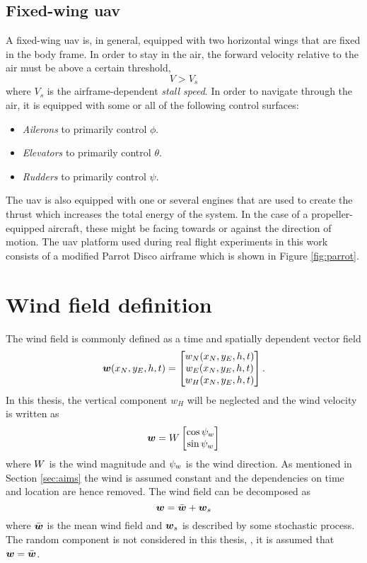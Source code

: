 \subsection{Fixed-wing \ac{uav}}
A fixed-wing \ac{uav} is, in general, equipped with two horizontal wings that are fixed in the body frame.
In order to stay in the air, the forward velocity relative to the air must be above a certain threshold, \ie
\begin{equation}
    V > V_{s}
\end{equation}
where $V_s$ is the airframe-dependent \textit{stall speed}. In order to navigate through the
air, it is equipped with some or all of the following control surfaces:
\begin{itemize}
    \item \textit{Ailerons} to primarily control $\phi$.
    \item \textit{Elevators} to primarily control $\theta$.
    \item \textit{Rudders} to primarily control $\psi$.
\end{itemize}
The \ac{uav} is also equipped with one or several engines that are used to create the thrust which
increases the total energy of the system. In the case of a propeller-equipped aircraft, these might be facing towards or against the direction of motion.
The \ac{uav} platform used during real flight experiments in this work consists of a modified Parrot Disco airframe which is shown in Figure \ref{fig:parrot}.


\section{Wind field definition}
The wind field is commonly defined as a time and spatially dependent vector field \cite{wind_direct_computation}
\begin{equation}
    \boldsymbol{w}(x_N,y_E,h,t)=
    \begin{bmatrix}
        w_N(x_N,y_E,h,t) \\
        w_E(x_N,y_E,h,t) \\
        w_H(x_N,y_E,h,t)
    \end{bmatrix}
    .
\end{equation}
In this thesis, the vertical component $w_H$ will be neglected and the wind velocity is written as 
\begin{equation}
    \boldsymbol{w}=W\begin{bmatrix}
        \cos\psi_w\\
        \sin\psi_w
    \end{bmatrix}
\end{equation}
where $W$ is the wind magnitude and $\psi_w$ is the wind direction. 
As mentioned in Section \ref{sec:aims} the wind is assumed constant and the dependencies on time and location are hence removed.
The wind field can be decomposed as
\begin{equation}
    \boldsymbol{w} = \bar{\boldsymbol{w}} + \boldsymbol{w}_s
\end{equation}
where $\bar{\boldsymbol{w}}$ is the mean wind field and $\boldsymbol{w}_s$ is described by some stochastic process. The random component is not considered in this thesis, \ie, it is assumed that $\boldsymbol{w}=\bar{\boldsymbol{w}}$.

